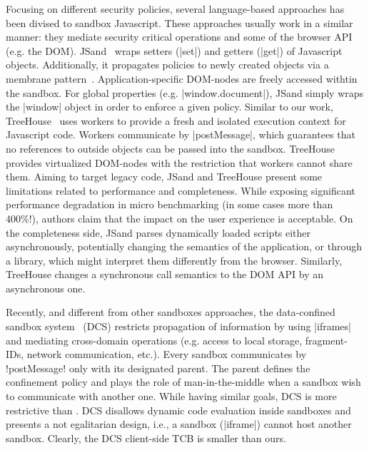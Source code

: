 Focusing on different security policies, several language-based approaches has
been divised to sandbox Javascript.  These approaches usually work in a similar
manner: they mediate security critical operations and some of the browser API
(e.g. the DOM).
JSand~\cite{Agten:2012:JCC} wraps setters (\js|set|) and getters (\js|get|) of Javascript
objects. Additionally, it propagates policies to newly created objects via a
membrane pattern~\cite{RobustComposition}. Application-specific DOM-nodes are freely accessed
withtin the sandbox. For global properties (e.g. \js|window.document|), JSand
simply wraps the \js|window| object in order to enforce a given policy.
Similar to our work, TreeHouse~\cite{Ingram:2012} uses workers to provide a
fresh and isolated execution context for Javascript code. Workers communicate by
\js|postMessage|, which guarantees that no references to outside objects can be
passed into the sandbox. TreeHouse provides virtualized DOM-nodes with the
restriction that workers cannot share them.
Aiming to target legacy code, JSand and TreeHouse present some limitations
related to performance and completeness.
While exposing significant performance degradation in micro benchmarking (in
some cases more than 400\%!), authors claim that the impact on the user
experience is acceptable.
On the completeness side, JSand parses dynamically loaded scripts either
asynchronously, potentially changing the semantics of the application, or
through a library, which might interpret them differently from the
browser. Similarly, TreeHouse changes a synchronous call semantics to the DOM
API by an asynchronous one.


Recently, and different from other sandboxes approaches, the data-confined
sandbox system~\cite{Akhawe2013} (DCS) restricts propagation of information by using
\js|iframes| and mediating cross-domain operations (e.g. access to local
storage, fragment-IDs, network communication, etc.).  Every sandbox communicates
by \js!postMessage! only with its designated parent. The parent defines the
confinement policy and plays the role of man-in-the-middle when a sandbox wish
to communicate with another one. While having similar goals, DCS is more
restrictive than \sys. DCS disallows dynamic code evaluation inside sandboxes
and presents a not egalitarian design, i.e., a sandbox (\js|iframe|) cannot host
another sandbox. Clearly, the DCS client-side TCB is smaller than ours.


